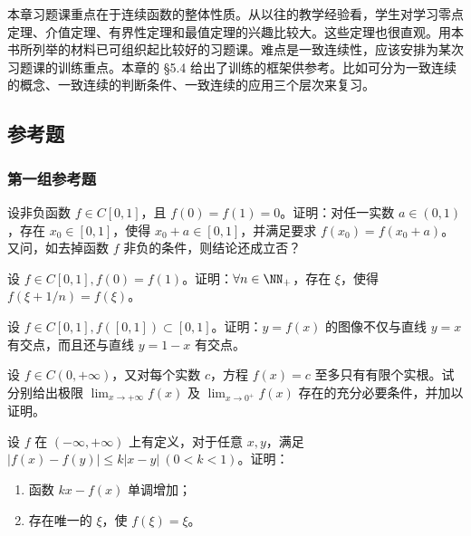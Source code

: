 本章习题课重点在于连续函数的整体性质。从以往的教学经验看，学生对学习零点定理、介值定理、有界性定理和最值定理的兴趣比较大。这些定理也很直观。用本书所列举的材料已可组织起比较好的习题课。难点是一致连续性，应该安排为某次习题课的训练重点。本章的 §5.4 给出了训练的框架供参考。比如可分为一致连续的概念、一致连续的判断条件、一致连续的应用三个层次来复习。

\subsection{参考题}

\subsubsection*{第一组参考题}

\begin{xreferenceproblem}[1]
设非负函数 $f\in C[0,1]$，且 $f(0)=f(1)=0$。证明：对任一实数 $a\in(0,1)$，存在 $x_0\in[0,1]$，使得 $x_0+a\in[0,1]$，并满足要求 $f(x_0)=f(x_0+a)$。又问，如去掉函数 $f$ 非负的条件，则结论还成立否？
\end{xreferenceproblem}

\begin{xreferenceproblem}[2]
设 $f\in C[0,1],f(0)=f(1)$。证明：$\forall n\in\NN_+$，存在 $\xi$，使得 $f(\xi+1/n)=f(\xi)$。
\end{xreferenceproblem}

\begin{xreferenceproblem}[3]
设 $f\in C[0,1],f([0,1])\subset[0,1]$。证明：$y=f(x)$ 的图像不仅与直线 $y=x$ 有交点，而且还与直线 $y=1-x$ 有交点。
\end{xreferenceproblem}

\begin{xreferenceproblem}[4]
设 $f\in C(0,+\infty)$，又对每个实数 $c$，方程 $f(x)=c$ 至多只有有限个实根。试分别给出极限 $\lim_{x\to+\infty}f(x)$ 及 $\lim_{x\to0^+}f(x)$ 存在的充分必要条件，并加以证明。
\end{xreferenceproblem}

\begin{xreferenceproblem}[5]
设 $f$ 在 $(-\infty,+\infty)$ 上有定义，对于任意 $x,y$，满足 $|f(x)-f(y)|\le k|x-y|\ (0<k<1)$。证明：
  \begin{enumerate}[label=(\arabic*)]
    \item 函数 $kx-f(x)$ 单调增加；
    \item 存在唯一的 $\xi$，使 $f(\xi)=\xi$。
  \end{enumerate}
\end{xreferenceproblem}

